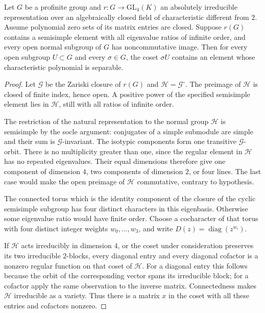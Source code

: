 \begin{srlemma}
\label{lem:sr-four-regular-coset}
Let \(G\) be a profinite group and
\(r:G\to\mathrm{GL}_4(K)\) an absolutely irreducible
representation over an algebraically closed field of
characteristic different from \(2\).
Assume polynomial zero sets of its matrix entries are closed.
Suppose \(r(G)\) contains a semisimple element with all
eigenvalue ratios of infinite order, and every open normal
subgroup of \(G\) has noncommutative image.
Then for every open subgroup \(U\subset G\) and every
\(\sigma\in G\), the coset \(\sigma U\) contains an element
whose characteristic polynomial is separable.
\end{srlemma}
\begin{proof}
Let \(\mathcal G\) be the Zariski closure of \(r(G)\) and
\(\mathcal H=\mathcal G^\circ\).
The preimage of \(\mathcal H\) is closed of finite index,
hence open.
A positive power of the specified semisimple element lies
in \(\mathcal H\), still with all ratios of infinite order.

The restriction of the natural representation to the normal
group \(\mathcal H\) is semisimple by the socle argument:
conjugates of a simple submodule are simple and their sum is
\(\mathcal G\)-invariant.
The isotypic components form one transitive \(\mathcal G\)-orbit.
There is no multiplicity greater than one, since the regular
element in \(\mathcal H\) has no repeated eigenvalues.
Their equal dimensions therefore give one component of
dimension \(4\), two components of dimension \(2\), or four
lines.
The last case would make the open preimage of
\(\mathcal H\) commutative, contrary to hypothesis.

The connected torus which is the identity component of the
closure of the cyclic semisimple subgroup has four distinct
characters in this eigenbasis. Otherwise some eigenvalue
ratio would have finite order.
Choose a cocharacter of that torus with four distinct integer
weights \(w_0,\ldots,w_3\), and write
\(D(z)=\operatorname{diag}(z^{w_i})\).

If \(\mathcal H\) acts irreducibly in dimension \(4\), or the
coset under consideration preserves its two irreducible
\(2\)-blocks, every diagonal entry and every diagonal cofactor
is a nonzero regular function on that coset of \(\mathcal H\).
For a diagonal entry this follows because the orbit of the
corresponding vector spans its irreducible block; for a
cofactor apply the same observation to the inverse matrix.
Connectedness makes \(\mathcal H\) irreducible as a variety.
Thus there is a matrix \(x\) in the coset with all these
entries and cofactors nonzero.


\end{proof}
